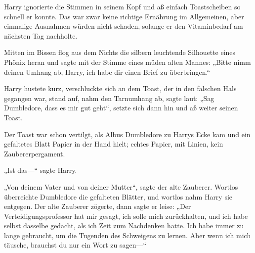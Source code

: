 Harry ignorierte die Stimmen in seinem Kopf und aß einfach Toastscheiben so schnell er konnte. Das war zwar keine richtige Ernährung im Allgemeinen, aber einmalige Ausnahmen würden nicht schaden, solange er den Vitaminbedarf am nächsten Tag nachholte.

Mitten im Bissen flog aus dem Nichts die silbern leuchtende Silhouette eines Phönix heran und sagte mit der Stimme eines müden alten Mannes: „Bitte nimm deinen Umhang ab, Harry, ich habe dir einen Brief zu überbringen.“

Harry hustete kurz, verschluckte sich an dem Toast, der in den falschen Hals gegangen war, stand auf, nahm den Tarnumhang ab, sagte laut: „Sag Dumbledore, dass es mir gut geht“, setzte sich dann hin und aß weiter seinen Toast.

Der Toast war schon vertilgt, als Albus Dumbledore zu Harrys Ecke kam und ein gefaltetes Blatt Papier in der Hand hielt; echtes Papier, mit Linien, kein Zaubererpergament.

„Ist das—“ sagte Harry.

„Von deinem Vater und von deiner Mutter“, sagte der alte Zauberer. Wortlos überreichte Dumbledore die gefalteten Blätter, und wortlos nahm Harry sie entgegen. Der alte Zauberer zögerte, dann sagte er leise: „Der Verteidigungsprofessor hat mir gesagt, ich solle mich zurückhalten, und ich habe selbst dasselbe gedacht, als ich Zeit zum Nachdenken hatte. Ich habe immer zu lange gebraucht, um die Tugenden des Schweigens zu lernen. Aber wenn ich mich täusche, brauchst du nur ein Wort zu sagen—“

